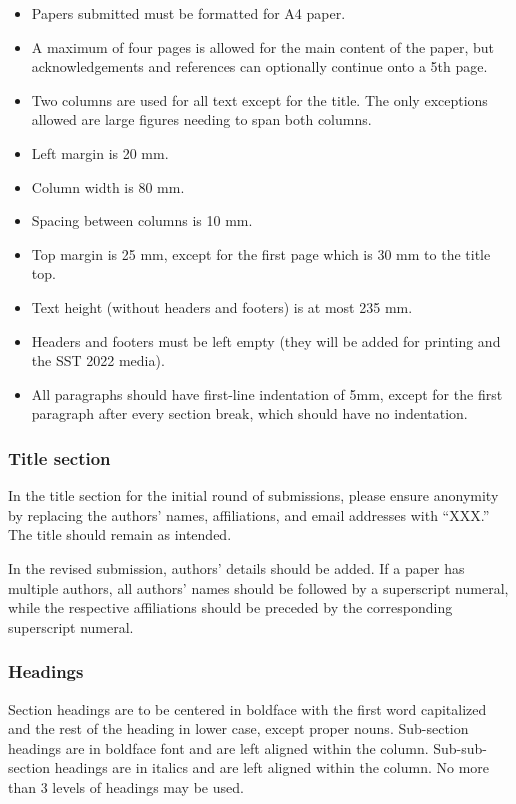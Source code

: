 \documentclass[a4paper]{article}
\begin{document}
\begin{itemize}
\item Papers submitted must be formatted for A4 paper.
\item A maximum of four pages is allowed for the main content of the paper, but acknowledgements and references can optionally continue onto a 5th page.
\item Two columns are used for all text except for the title.  The only exceptions allowed are large figures needing to span both columns.
\item Left margin is 20 mm.
\item Column width is 80 mm.
\item Spacing between columns is 10 mm.
\item Top margin is 25 mm, except for the first page which is 30 mm to the title top.
\item Text height (without headers and footers) is at most 235 mm.
\item Headers and footers must be left empty (they will be added for printing and the SST 2022 media).
\item All paragraphs should have first-line indentation of 5mm, except for the first paragraph after every section break, which should have no indentation.
\end{itemize}

\subsubsection{Title section}

In the title section for the initial round of submissions, please ensure anonymity by replacing the authors' names, affiliations, and email addresses with ``XXX.''  The title should remain as intended.

In the revised submission, authors' details should be added. If a paper has multiple authors, all authors' names should be followed by a superscript numeral, while the respective affiliations should be preceded by the corresponding superscript numeral.

\subsubsection{Headings}

Section headings are to be centered in boldface with the first word capitalized and the rest of the heading in lower case, except proper nouns. Sub-section headings are in boldface font and are left aligned within the column. Sub-sub-section headings are in italics and are left aligned within the column. No more than 3 levels of headings may be used.
\end{document}
